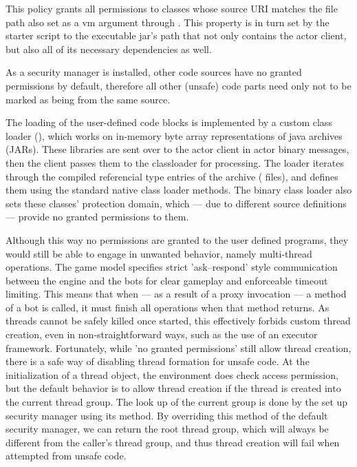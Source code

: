 			This policy grants all permissions to classes whose source URI matches the file path also set as a vm argument through . This property is in turn set by the starter script to the executable jar's path that not only contains the actor client, but also all of its necessary dependencies as well.
			
			As a security manager is installed, other code sources have no granted permissions by default, therefore all other (unsafe) code parts need only not to be marked as being from the same source.
			
			The loading of the user-defined code blocks is implemented by a custom class loader (), which works on in-memory byte array representations of java archives (JARs). These libraries are sent over to the actor client in actor binary messages, then the client passes them to the classloader for processing. The loader iterates through the compiled referencial type entries of the archive ( files), and defines them using the standard native class loader methods. The binary class loader also sets these classes' protection domain, which --- due to different source definitions --- provide no granted permissions to them.
			
			Although this way no permissions are granted to the user defined programs, they would still be able to engage in unwanted behavior, namely multi-thread operations. The game model specifies strict 'ask--respond' style communication between the engine and the bots for clear gameplay and enforceable timeout limiting. This means that when --- as a result of a proxy invocation --- a method of a bot is called, it must finish all operations when that method returns. As threads cannot be safely killed once started, this effectively forbids custom thread creation, even in non-straightforward ways, such as the use of an executor framework. Fortunately, while 'no granted permissions' still allow thread creation, there is a safe way of disabling thread formation for unsafe code. At the initialization of a thread object, the environment does check access permission, but the default behavior is to allow thread creation if the thread is created into the current thread group. The look up of the current group is done by the set up security manager using its  method. By overriding this method of the default security manager, we can return the root thread group, which will always be different from the caller's thread group, and thus thread creation will fail when attempted from unsafe code.
			
